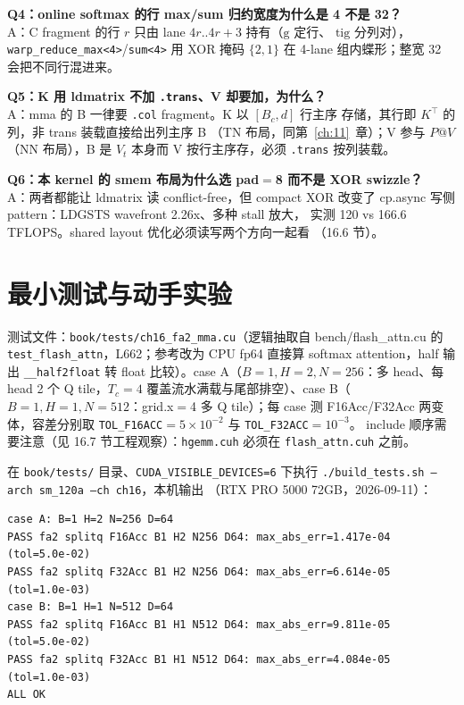 \textbf{Q4：online softmax 的行 max/sum 归约宽度为什么是 4 不是 32？}\\
A：C fragment 的行 $r$ 只由 lane $4r..4r{+}3$ 持有（$\mathrm{g}$ 定行、
$\mathrm{tig}$ 分列对），\texttt{warp\_\allowbreak{}reduce\_\allowbreak{}max\allowbreak{}<4>}/\texttt{sum<4>}
用 XOR 掩码 $\{2,1\}$ 在 4-lane 组内蝶形；整宽 32 会把不同行混进来。

\textbf{Q5：K 用 ldmatrix 不加 \texttt{.trans}、V 却要加，为什么？}\\
A：mma 的 B 一律要 \texttt{.col} fragment。K 以 $[B_c,d]$ 行主序
存储，其行即 $K^\top$ 的列，非 trans 装载直接给出列主序 B
（TN 布局，同第~\ref{ch:11}~章）；V 参与 $P@V$（NN 布局），B 是
$V_t$ 本身而 V 按行主序存，必须 \texttt{.trans} 按列装载。

\textbf{Q6：本 kernel 的 smem 布局为什么选 pad$=$8 而不是 XOR swizzle？}\\
A：两者都能让 ldmatrix 读 conflict-free，但 compact XOR 改变了
cp.async 写侧 pattern：LDGSTS wavefront 2.26x、多种 stall 放大，
实测 120 vs 166.6 TFLOPS。shared layout 优化必须读写两个方向一起看
（16.6 节）。

\section{最小测试与动手实验}

测试文件：\texttt{book/\allowbreak{}tests/\allowbreak{}ch16\_\allowbreak{}fa2\_\allowbreak{}mma.\allowbreak{}cu}（逻辑抽取自
bench/flash\_attn.cu 的 \texttt{test\_\allowbreak{}flash\_\allowbreak{}attn}，L662；参考改为 CPU fp64
直接算 softmax attention，half 输出 \texttt{\_\allowbreak{}\_\allowbreak{}half2float} 转 float
比较）。case A（$B{=}1,H{=}2,N{=}256$：多 head、每 head 2 个 Q tile，$T_c{=}4$
覆盖流水满载与尾部排空）、case B（$B{=}1,H{=}1,N{=}512$：grid.x$=$4
多 Q tile）；每 case 测 F16Acc/F32Acc 两变体，容差分别取
\texttt{TOL\_F16ACC}$=5\times10^{-2}$ 与 \texttt{TOL\_F32ACC}$=10^{-3}$。
include 顺序需要注意（见 16.7 节工程观察）：\texttt{hgemm.cuh} 必须在
\texttt{flash\_\allowbreak{}attn.\allowbreak{}cuh} 之前。

在 \texttt{book/tests/} 目录、\texttt{CUDA\_\allowbreak{}VISIBLE\_\allowbreak{}DEVICES=\allowbreak{}6} 下执行
\texttt{.\allowbreak{}/\allowbreak{}build\_\allowbreak{}tests.\allowbreak{}sh --arch sm\_\allowbreak{}120a --ch ch16}，本机输出
（RTX PRO 5000 72GB，2026-09-11）：

\begin{lstlisting}[style=console]
case A: B=1 H=2 N=256 D=64
PASS fa2 splitq F16Acc B1 H2 N256 D64: max_abs_err=1.417e-04 (tol=5.0e-02)
PASS fa2 splitq F32Acc B1 H2 N256 D64: max_abs_err=6.614e-05 (tol=1.0e-03)
case B: B=1 H=1 N=512 D=64
PASS fa2 splitq F16Acc B1 H1 N512 D64: max_abs_err=9.811e-05 (tol=5.0e-02)
PASS fa2 splitq F32Acc B1 H1 N512 D64: max_abs_err=4.084e-05 (tol=1.0e-03)
ALL OK
\end{lstlisting}

